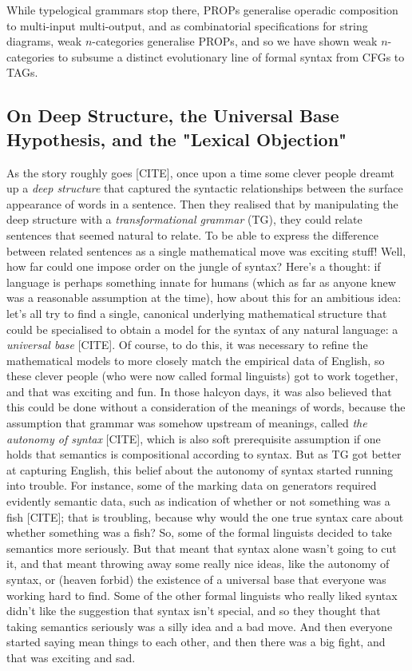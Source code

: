 While typelogical grammars stop there, PROPs generalise operadic composition to multi-input multi-output, and as combinatorial specifications for string diagrams, weak $n$-categories generalise PROPs, and so we have shown weak $n$-categories to subsume a distinct evolutionary line of formal syntax from CFGs to TAGs.\\

\subsection{On Deep Structure, the Universal Base Hypothesis, and the "Lexical Objection"}

As the story roughly goes [CITE], once upon a time some clever people dreamt up a \emph{deep structure} that captured the syntactic relationships between the surface appearance of words in a sentence. Then they realised that by manipulating the deep structure with a \emph{transformational grammar} (TG), they could relate sentences that seemed natural to relate. To be able to express the difference between related sentences as a single mathematical move was exciting stuff! Well, how far could one impose order on the jungle of syntax? Here's a thought: if language is perhaps something innate for humans (which as far as anyone knew was a reasonable assumption at the time), how about this for an ambitious idea: let's all try to find a single, canonical underlying mathematical structure that could be specialised to obtain a model for the syntax of any natural language: a \emph{universal base} [CITE]. Of course, to do this, it was necessary to refine the mathematical models to more closely match the empirical data of English, so these clever people (who were now called formal linguists) got to work together, and that was exciting and fun. In those halcyon days, it was also believed that this could be done without a consideration of the meanings of words, because the assumption that grammar was somehow upstream of meanings, called \emph{the autonomy of syntax} [CITE], which is also soft prerequisite assumption if one holds that semantics is compositional according to syntax. But as TG got better at capturing English, this belief about the autonomy of syntax started running into trouble. For instance, some of the marking data on generators required evidently semantic data, such as indication of whether or not something was a fish [CITE]; that is troubling, because why would the one true syntax care about whether something was a fish? So, some of the formal linguists decided to take semantics more seriously. But that meant that syntax alone wasn't going to cut it, and that meant throwing away some really nice ideas, like the autonomy of syntax, or (heaven forbid) the existence of a universal base that everyone was working hard to find. Some of the other formal linguists who really liked syntax didn't like the suggestion that syntax isn't special, and so they thought that taking semantics seriously was a silly idea and a bad move. And then everyone started saying mean things to each other, and then there was a big fight, and that was exciting and sad.\\

